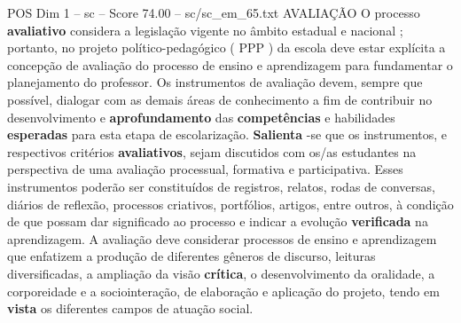 \begin{textsample}{POS Dim 1 – sc – Score 74.00 – sc/sc\_em\_65.txt}
AVALIAÇÃO O processo \textbf{avaliativo} considera a legislação vigente no âmbito estadual e nacional ; portanto, no projeto político-pedagógico ( PPP ) da escola deve estar explícita a concepção de avaliação do processo de ensino e aprendizagem para fundamentar o planejamento do professor.
Os instrumentos de avaliação devem, sempre que possível, dialogar com as demais áreas de conhecimento a fim de contribuir no desenvolvimento e \textbf{aprofundamento} das \textbf{competências} e habilidades \textbf{esperadas} para esta etapa de escolarização. \textbf{Salienta} -se que os instrumentos, e respectivos critérios \textbf{avaliativos}, sejam discutidos com os/as estudantes na perspectiva de uma avaliação processual, formativa e participativa.
Esses instrumentos poderão ser constituídos de registros, relatos, rodas de conversas, diários de reflexão, processos criativos, portfólios, artigos, entre outros, à condição de que possam dar significado ao processo e indicar a evolução \textbf{verificada} na aprendizagem.
A avaliação deve considerar processos de ensino e aprendizagem que enfatizem a produção de diferentes gêneros de discurso, leituras diversificadas, a ampliação da visão \textbf{crítica}, o desenvolvimento da oralidade, a corporeidade e a sociointeração, de elaboração e aplicação do projeto, tendo em \textbf{vista} os diferentes campos de atuação social.

\end{textsample}
